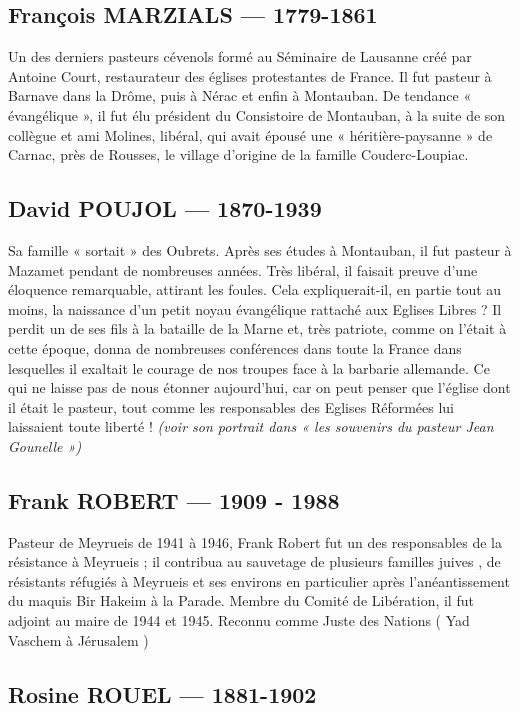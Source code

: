 \subsection{François MARZIALS --- 1779-1861}

Un des derniers pasteurs cévenols formé au Séminaire de Lausanne créé par Antoine
Court, restaurateur des églises protestantes de France. Il fut pasteur à Barnave dans
la Drôme, puis à Nérac et enfin à Montauban. De tendance « évangélique », il fut élu
président du Consistoire de Montauban, à la suite de son collègue et ami Molines,
libéral, qui avait épousé une « héritière-paysanne » de Carnac, près de Rousses, le
village d’origine de la famille Couderc-Loupiac.

\subsection{David POUJOL --- 1870-1939}

Sa famille « sortait » des Oubrets. Après ses études à Montauban, il fut pasteur à
Mazamet pendant de nombreuses années. Très libéral, il faisait preuve d’une
éloquence remarquable, attirant les foules. Cela expliquerait-il, en partie tout au
moins, la naissance d’un petit noyau évangélique rattaché aux Eglises Libres ?
Il perdit un de ses fils à la bataille de la Marne et, très patriote, comme on l’était à
cette époque, donna de nombreuses conférences dans toute la France dans lesquelles
il exaltait le courage de nos troupes face à la barbarie allemande. Ce qui ne laisse pas
de nous étonner aujourd’hui, car on peut penser que l’église dont il était le pasteur,
tout comme les responsables des Eglises Réformées lui laissaient toute liberté !
\emph{(voir son portrait dans « les souvenirs du pasteur Jean Gounelle »)}

\subsection{Frank ROBERT --- 1909 - 1988}

Pasteur de Meyrueis de 1941 à 1946, Frank Robert fut un des responsables de la
résistance à Meyrueis ; il contribua au sauvetage de plusieurs familles juives , de
résistants réfugiés à Meyrueis et ses environs en particulier après l’anéantissement
du maquis Bir Hakeim à la Parade.
Membre du Comité de Libération, il fut adjoint au maire de 1944 et 1945.
Reconnu comme Juste des Nations ( Yad Vaschem à Jérusalem )

\subsection{Rosine ROUEL --- 1881-1902}

